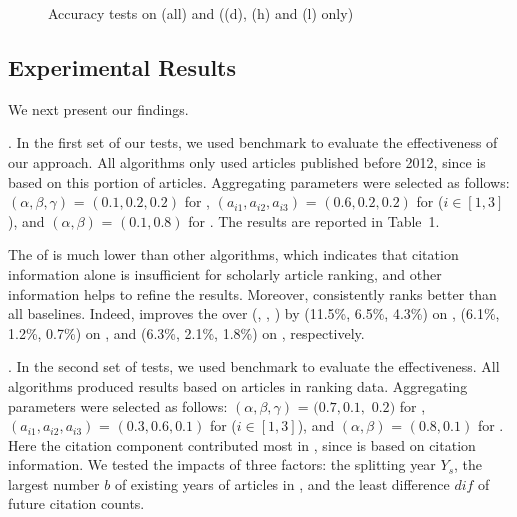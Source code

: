 \begin{figure}[tb!]
\begin{center}
\end{center}
\vspace{-5ex}
\caption{\small Accuracy tests on \fcita (all) and \recom ((d), (h) and (l) only)}
\label{fig-pairacc}
\vspace{-3ex}
\end{figure}



\subsection{Experimental Results}
\label{subsec-expres}

We next present our findings.

.
In the first set of our tests, we used benchmark \recom to evaluate the effectiveness of our approach.
All algorithms only used articles published before 2012, since \recom is based on this portion of articles.
Aggregating parameters were selected as follows: $(\alpha,\beta,\gamma)$ = $(0.1, 0.2, 0.2)$ for \futurerank, $(a_{i1},a_{i2},a_{i3})$ = $(0.6, 0.2, 0.2)$ for \hhgrank ($i\in[1,3]$), and $(\alpha,\beta)$ = $(0.1, 0.8)$ for \ensemblerank.
The results are reported in Table~1.

The \PairAcc of \pagerank is much lower than other algorithms, which indicates that citation information alone is insufficient for scholarly article ranking, and other information helps to refine the results. Moreover, \ensemblerank consistently ranks better than all baselines. Indeed, \ensemblerank improves the \PairAcc over (\pagerank, \futurerank, \hhgrank) by (11.5\%, 6.5\%, 4.3\%) on \aan, (6.1\%, 1.2\%, 0.7\%) on \aminer, and (6.3\%, 2.1\%, 1.8\%) on \magdata, respectively.


.
In the second set of tests, we used benchmark \fcita to evaluate the effectiveness.
All algorithms produced results based on articles in ranking data.
Aggregating parameters were selected as follows: $(\alpha, \beta, \gamma)$ = $(0.7, 0.1,$ $0.2)$ for \futurerank, $(a_{i1}, a_{i2}, a_{i3})$ = $(0.3, 0.6, 0.1)$ for \hhgrank ($i\in[1, 3]$), and $(\alpha, \beta)$ = $(0.8, 0.1)$ for \ensemblerank.
Here the citation component contributed most in \ensemblerank, since \fcita is based on citation information.
We tested the impacts of three factors: the splitting year $Y_s$, the largest number $b$ of existing years of articles in \fcita, and the least difference $dif$ of future citation counts.



